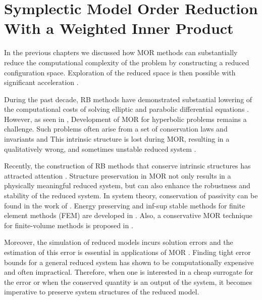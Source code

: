 \chapter{Symplectic Model Order Reduction With a Weighted Inner Product} \label{chapter:5}

In the previous chapters we discussed how MOR methods can substantially reduce the computational complexity of the problem by constructing a reduced configuration space. Exploration of the reduced space is then possible with significant acceleration \cite{hesthaven2015certified,Haasdonk2017}.

During the past decade, RB methods have demonstrated substantial lowering of the computational costs of solving elliptic and parabolic differential equations \cite{ito1998reduced,ito2001reduced}. However, as seen in , Development of MOR for hyperbolic problems remains a challenge. Such problems often arise from a set of conservation laws and invariants and This intrinsic structure is lost during MOR, resulting in a qualitatively wrong, and sometimes unstable reduced system \cite{Amsallem:2014ef}.

Recently, the construction of RB methods that conserve intrinsic structures has attracted attention \cite{doi:10.1137/17M1111991,doi:10.1137/17M1111991,kalashnikova2014stabilization,farhat2015structure,doi:10.1137/110836742,doi:10.1137/140959602,beattie2011structure,doi:10.1137/140978922}. Structure preservation in MOR not only results in a physically meaningful reduced system, but can also enhance the robustness and stability of the reduced system. In system theory, conservation of passivity can be found in the work of \cite{polyuga2010structure,gugercin2012structure}. Energy preserving and inf-sup stable methods for finite element methods (FEM) are developed in \cite{farhat2015structure,ballarin2015supremizer}. Also, a conservative MOR technique for finite-volume methods is proposed in \cite{1711.11550}.

Moreover, the simulation of reduced models incurs solution errors and the estimation of this error is essential in applications of MOR \cite{HaasdonkOhlberger11,RuinerEtAl12,BhattEtAl18}. Finding tight error bounds for a general reduced system has shown to be computationally expensive and often impractical. Therefore, when one is interested in a cheap surrogate for the error or when the conserved quantity is an output of the system, it becomes imperative to preserve system structures of the reduced model.

